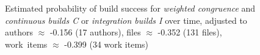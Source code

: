 \documentclass[12pt,oneside]{book}
\begin{document}
\begin{figure}
{     \label{subfig:prob_weighted_age_typeci_q025}
  }
  
	\caption{Estimated probability of build success for \emph{weighted congruence} and \emph{continuous builds C} or \emph{integration builds I}  over time, adjusted to authors $\approx$ -0.156 (17 authors), files $\approx$ -0.352 (131 files), work~items $\approx$ -0.399 (34 work items)}
	\label{fig:weighted_congruence_typeci_age}
\end{figure}
\end{document}
